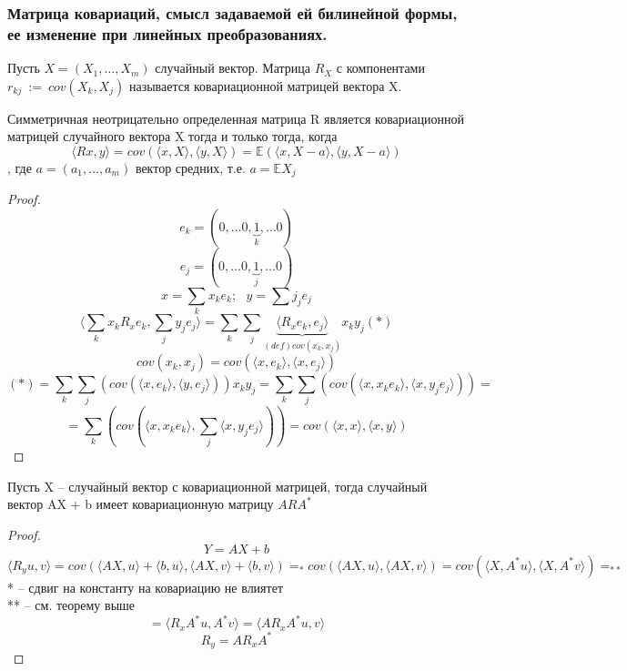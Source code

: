 	\subsubsection{Матрица ковариаций, смысл задаваемой ей билинейной формы, ее изменение при линейных преобразованиях. }
	\begin{definition}
		Пусть $ X = (X_1,\ldots, X_m) $ случайный вектор. Матрица $ R_X $ с компонентами $ r_{kj}~:=~cov(X_k, X_j ) $ называется ковариационной матрицей вектора X.
	\end{definition}
	\begin{theorem}
		Симметричная неотрицательно определенная матрица R является ковариационной матрицей случайного вектора X тогда и только тогда, когда
		$$\langle Rx, y\rangle = cov(\langle x, X\rangle, \langle y, X\rangle) = \mathbb{E}(\langle x, X - a\rangle, \langle y, X - a\rangle)$$
		, где $ a = (a_1, \ldots, a_m) $ вектор средних, т.е. $ a = \mathbb{E}X_j $
	\end{theorem}
	\begin{proof}
		\text{ }\\
		$$e_k = (0, \ldots 0, \underbrace{1}_k, \ldots 0) $$
		$$e_j = (0, \ldots 0, \underbrace{1}_j, \ldots 0) $$
		$$x = \sum_{k}x_ke_k;\text{ }y = \sum j_je_j $$
		$$\langle \sum_{k}x_kR_x e_k, \sum_j y_je_j \rangle = \sum_{k}\sum_j\underbrace{\langle R_x e_k ,e_j\rangle}_{(def)cov(x_k, x_j)} x_ky_j (*)$$
		$$cov(x_k, x_j) = cov(\langle x, e_k\rangle, \langle x,e_j\rangle)$$
		$$ (*) =\sum_{k}\sum_j(cov(\langle x , e_k\rangle, \langle y, e_j\rangle)) x_ky_j = \sum_{k}\sum_j( cov(\langle x, x_ke_k\rangle, \langle x, y_je_j\rangle)) =$$
		$$ =  \sum_{k}( cov(\langle x, x_ke_k\rangle, \sum_j\langle x, y_je_j\rangle)) = cov(\langle x, x\rangle, \langle x, y\rangle)$$
	\end{proof}
	\begin{theorem}
		Пусть X -- случайный вектор с ковариационной матрицей, тогда случайный вектор AX + b имеет ковариационную матрицу $ ARA^* $
	\end{theorem}
	\begin{proof}
		$$ Y = AX + b $$
		$$ \langle R_yu, v\rangle = cov(\langle AX, u \rangle + \langle b, u \rangle, \langle AX, v \rangle + \langle b, v \rangle) =_{*} cov(\langle AX, u \rangle, \langle AX, v \rangle) = cov(\langle X, A^*u \rangle, \langle X, A^{*}v \rangle) =_{**}$$
		* -- сдвиг на константу на ковариацию не влиятет\\
		** -- см. теорему выше
		$$ = \langle R_xA^*u,A^*v\rangle =  \langle AR_xA^*u,v\rangle$$
		$$R_y = AR_xA^*$$
	\end{proof}
